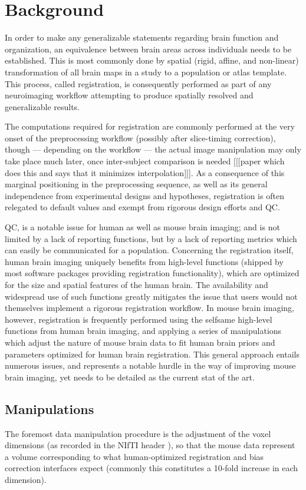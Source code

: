 \section{Background}

In order to make any generalizable statements regarding brain function and organization, an equivalence between brain areas across individuals needs to be established.
This is most commonly done by spatial (rigid, affine, and non-linear) transformation of all brain maps in a study to a population or atlas template.
This process, called registration, is consequently performed as part of any neuroimaging workflow attempting to produce spatially resolved and generalizable results.

The computations required for registration are commonly performed at the very onset of the preprocessing workflow (possibly after slice-timing correction),
though --- depending on the workflow --- the actual image manipulation may only take place much later, once inter-subject comparison is needed [[[paper which does this and says that it minimizes interpolation]]].
As a consequence of this marginal positioning in the preprocessing sequence, as well as its general independence from experimental designs and hypotheses, registration is often relegated to default values and exempt from rigorous design efforts and QC.

QC, is a notable issue for human as well as mouse brain imaging;
and is not limited by a lack of reporting functions, but by a lack of reporting metrics which can easily be communicated for a population.
Concerning the registration itself, human brain imaging uniquely benefits from high-level functions (shipped by most software packages providing registration functionality), which are optimized for the size and spatial features of the human brain.
The availability and widespread use of such functions greatly mitigates the issue that users would not themselves implement a rigorous registration workflow.
In mouse brain imaging, however, registration is frequently performed using the selfsame high-level functions from human brain imaging, and applying a series of manipulations which adjust the nature of mouse brain data to fit human brain priors and parameters optimized for human brain registration.
This general approach entails numerous issues, and represents a notable hurdle in the way of improving mouse brain imaging, yet needs to be detailed as the current stat of the art.

\subsection{Manipulations}
The foremost data manipulation procedure is the adjustment of the voxel dimensions (as recorded in the NIfTI header \cite{nifti}), so that the mouse data represent a volume corresponding to what human-optimized registration and bias correction interfaces expect (commonly this constitutes a 10-fold increase in each dimension).	


